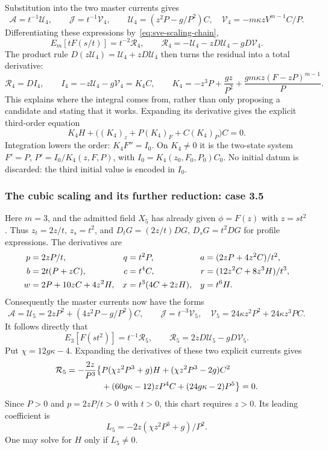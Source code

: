 Substitution into the two master currents gives
\[
 \mathcal A=t^{-1}\mathcal U_4,\qquad
 \mathcal J=t^{-1}\mathcal V_4,\qquad
 \mathcal U_4=(z^2P-g/P^2)C,\quad
 \mathcal V_4=-m\kappa zV^{m-1}C/P.
\]
Differentiating these expressions by~\eqref{eq:sve-scaling-chain},
\begin{equation}
 E_m[tF(s/t)]=t^{-2}\mathcal R_4,\qquad
 \mathcal R_4=-\mathcal U_4-zD\mathcal U_4-gD\mathcal V_4.
 \label{eq:sve-repro-scale-residual}
\end{equation}
The product rule $D(z\mathcal U_4)=\mathcal U_4+zD\mathcal U_4$
then turns the residual into a total derivative:
\begin{equation}
 \mathcal R_4=D I_4,\qquad
 I_4=-z\mathcal U_4-g\mathcal V_4=K_4C,\qquad
 K_4=-z^3P+\frac{gz}{P^2}
                 +\frac{gm\kappa z(F-zP)^{m-1}}P.
 \label{eq:sve-repro-first-integral}
\end{equation}
This explains where the integral comes from, rather than only proposing
a candidate and stating that it works. Expanding its derivative gives
the explicit third-order equation
\begin{equation}
 K_4H+\big((K_4)_z+P(K_4)_F+C(K_4)_P\big)C=0.
 \label{eq:sve-common-expanded}
\end{equation}
Integration lowers the order: $K_4F''=I_0$. On $K_4\ne0$ it is the
two-state system $F'=P$, $P'=I_0/K_4(z,F,P)$, with
$I_0=K_4(z_0,F_0,P_0)C_0$. No initial datum is discarded: the third
initial value is encoded in $I_0$.

\subsubsection{The cubic scaling and its further reduction: case 3.5}
Here $m=3$, and the admitted field $X_5$ has already given
$\phi=F(z)$ with $z=st^2$. Thus $z_t=2z/t$, $z_s=t^2$, and
$D_tG=(2z/t)DG$, $D_sG=t^2DG$ for profile expressions. The derivatives are
\begin{align}
 p&=2zP/t,&q&=t^2P,&a&=(2zP+4z^2C)/t^2,\notag\\
 b&=2t(P+zC),&c&=t^4C,&r&=(12z^2C+8z^3H)/t^3,\notag\\
 w&=2P+10zC+4z^2H,&x&=t^3(4C+2zH),&y&=t^6H.
 \label{eq:sve-cubic-jets}
\end{align}
Consequently the master currents now have the forms
\[
 \mathcal A=\mathcal U_5=2zP^2+(4z^2P-g/P^2)C,\qquad
 \mathcal J=t^{-3}\mathcal V_5,\quad
 \mathcal V_5=24\kappa z^2P^2+24\kappa z^3PC.
\]
It follows directly that
\[
 E_3[F(st^2)]=t^{-1}\mathcal R_5,\qquad
 \mathcal R_5=2zD\mathcal U_5-gD\mathcal V_5.
\]
Put $\chi=12g\kappa-4$. Expanding the derivatives of these two explicit
currents gives
\begin{align}
 \mathcal R_5=-\frac{2z}{P^3}\big\{&
    P(\chi z^2P^3+g)H+(\chi z^2P^3-2g)C^2\notag\\
    &+(60g\kappa-12)zP^4C+(24g\kappa-2)P^5\big\}=0.
 \label{eq:sve-cubic-expanded}
\end{align}
Since $P>0$ and $p=2zP/t>0$ with $t>0$, this
chart requires $z>0$. Its leading coefficient is
\[
 L_5=-2z(\chi z^2P^3+g)/P^2.
\]
One may solve for $H$ only if $L_5\ne0$.

